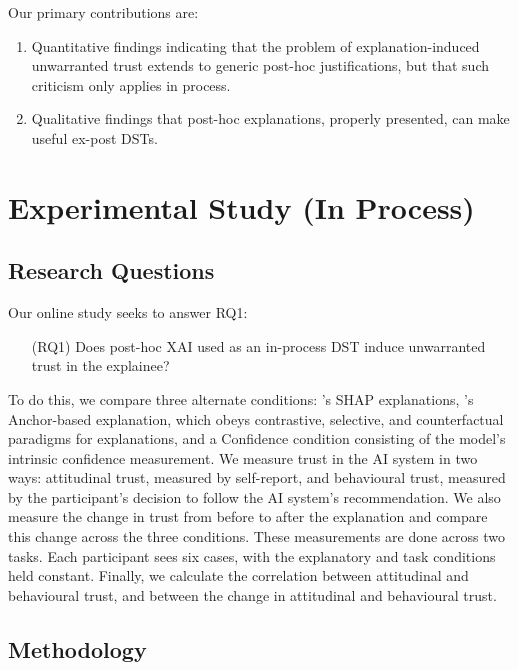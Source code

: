 Our primary contributions are:

\begin{enumerate}
    \item Quantitative findings indicating that the problem of explanation-induced unwarranted trust extends to generic post-hoc justifications, but that such criticism only applies in process.
    \item Qualitative findings that post-hoc explanations, properly presented, can make useful ex-post DSTs.
\end{enumerate}

\section[Experimental Study]{Experimental Study (In Process)}\label{sec:online}
\subsection{Research Questions}
Our online study seeks to answer RQ1:

\begin{enumerate}
    \item[(RQ1)] Does post-hoc XAI used as an in-process DST induce unwarranted trust in the explainee?
\end{enumerate}

To do this, we compare three alternate conditions: \textcite{lundberg_unified_2017}'s SHAP explanations, \textcite{ribeiro_anchors_2018}'s Anchor-based explanation, which obeys contrastive, selective, and counterfactual paradigms for explanations, and a Confidence condition consisting of the model's intrinsic confidence measurement. We measure trust in the AI system in two ways: attitudinal trust, measured by self-report, and behavioural trust, measured by the participant's decision to follow the AI system's recommendation. We also measure the change in trust from before to after the explanation and compare this change across the three conditions. These measurements are done across two tasks. Each participant sees six cases, with the explanatory and task conditions held constant. Finally, we calculate the correlation between attitudinal and behavioural trust, and between the change in attitudinal and behavioural trust.

\subsection{Methodology}
